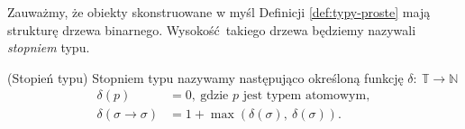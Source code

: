 Zauważmy, że obiekty skonstruowane w myśl Definicji \ref{def:typy-proste} mają strukturę drzewa binarnego. Wysokość takiego drzewa będziemy nazywali \emph{stopniem} typu. 
\begin{definicja}\label{def:stopien-typu}(Stopień typu)
  Stopniem typu nazywamy następująco określoną funkcję \(\delta :\: \mathbb{T} \to \mathbb{N}\)
  \begin{align*}
    \delta(p) &= 0,\ \text{gdzie \(p\) jest typem atomowym},\\
    \delta(\sigma\to\sigma)&=1 + \max\left(\delta(\sigma),\ \delta(\sigma)\right).
  \end{align*}
\end{definicja}



